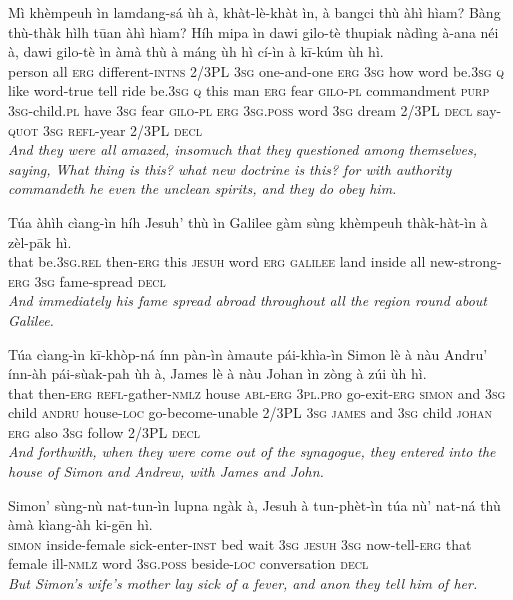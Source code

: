 \documentclass[11pt,a4paper]{article}
\begin{document}
\begin{exe}
\gll Mì khèmpeuh ìn lamdang-sá ùh à, khàt-lè-khàt ìn, à bangci thù àhì hìam? Bàng thù-thàk hìlh tūan àhì hìam? Híh mipa ìn dawi gilo-tè thupiak nàdìng à-ana néi à, dawi gilo-tè ìn àmà thù à máng ùh hì cí-ìn à kī-kúm ùh hì. \\
     person all \textsc{erg} different-\textsc{intns} 2/3PL \textsc{3sg} one-and-one \textsc{erg} \textsc{3sg} how word be.\textsc{3sg} \textsc{q} like word-true tell ride be.\textsc{3sg} \textsc{q} this man \textsc{erg} fear \textsc{gilo}-\textsc{pl} commandment \textsc{purp} \textsc{3sg}-child.\textsc{pl} have \textsc{3sg} fear \textsc{gilo}-\textsc{pl} \textsc{erg} \textsc{3sg}.\textsc{poss} word \textsc{3sg} dream 2/3PL \textsc{decl} say-\textsc{quot} \textsc{3sg} \textsc{refl}-year 2/3PL \textsc{decl} \\
\glt \textcolor{kjvcolor}{\textit{And they were all amazed, insomuch that they questioned among themselves, saying, What thing is this? what new doctrine is this? for with authority commandeth he even the unclean spirits, and they do obey him.}}

\gll Túa àhìh cìang-ìn híh Jesuh' thù ìn Galilee gàm sùng khèmpeuh thàk-hàt-ìn à zèl-pāk hì. \\
     that be.\textsc{3sg}.\textsc{rel} then-\textsc{erg} this \textsc{jesuh} word \textsc{erg} \textsc{galilee} land inside all new-strong-\textsc{erg} \textsc{3sg} fame-spread \textsc{decl} \\
\glt \textcolor{kjvcolor}{\textit{And immediately his fame spread abroad throughout all the region round about Galilee.}}

\gll Túa cìang-ìn kī-khòp-ná ínn pàn-ìn àmaute pái-khìa-ìn Simon lè à nàu Andru' ínn-àh pái-sùak-pah ùh à, James lè à nàu Johan ìn zòng à zúi ùh hì. \\
     that then-\textsc{erg} \textsc{refl}-gather-\textsc{nmlz} house \textsc{abl}-\textsc{erg} \textsc{3pl}.\textsc{pro} go-exit-\textsc{erg} \textsc{simon} and \textsc{3sg} child \textsc{andru} house-\textsc{loc} go-become-unable 2/3PL \textsc{3sg} \textsc{james} and \textsc{3sg} child \textsc{johan} \textsc{erg} also \textsc{3sg} follow 2/3PL \textsc{decl} \\
\glt \textcolor{kjvcolor}{\textit{And forthwith, when they were come out of the synagogue, they entered into the house of Simon and Andrew, with James and John.}}

\gll Simon' sùng-nù nat-tun-ìn lupna ngàk à, Jesuh à tun-phèt-ìn túa nù' nat-ná thù àmà kìang-àh ki-gēn hì. \\
     \textsc{simon} inside-female sick-enter-\textsc{inst} bed wait \textsc{3sg} \textsc{jesuh} \textsc{3sg} now-tell-\textsc{erg} that female ill-\textsc{nmlz} word \textsc{3sg}.\textsc{poss} beside-\textsc{loc} conversation \textsc{decl} \\
\glt \textcolor{kjvcolor}{\textit{But Simon's wife's mother lay sick of a fever, and anon they tell him of her.}}


\end{exe}
\end{document}
